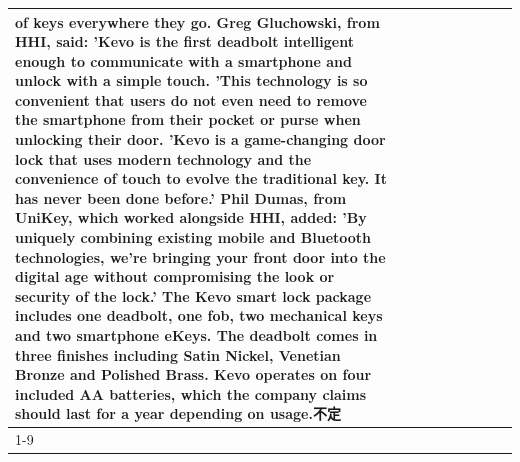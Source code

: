 \begin{table}[H]
\begin{tabular}{lllrlllll}
of keys everywhere they go. Greg Gluchowski, from HHI, said: 'Kevo is the first deadbolt intelligent enough to communicate with a smartphone and unlock with a simple touch. 'This technology is so convenient that users do not even need to remove the smartphone from their pocket or purse when unlocking their door. 'Kevo is a game-changing door lock that uses modern technology and the convenience of touch to evolve the traditional key. It has never been done before.' Phil Dumas, from UniKey, which worked alongside HHI, added: 'By uniquely combining existing mobile and Bluetooth technologies, we’re bringing your front door into the digital age without compromising the look or security of the lock.' The Kevo smart lock package includes one deadbolt, one fob, two mechanical keys and two smartphone eKeys. The deadbolt comes in three finishes including Satin Nickel, Venetian Bronze and Polished Brass. Kevo operates on four included AA batteries, which the company claims should last for a year depending on usage.不定 \\
\cline{1-9}

\end{tabular}
\end{table}
